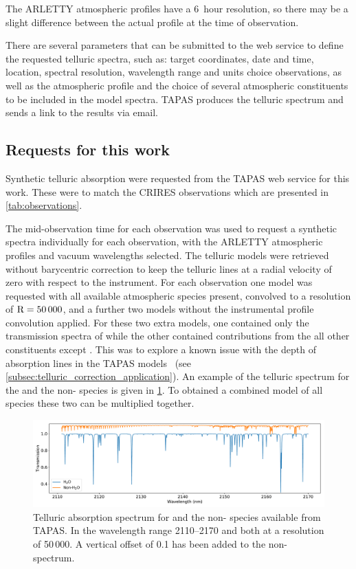 The {ARLETTY} atmospheric profiles have a 6~hour resolution, so there may be a slight difference between the actual profile at the time of observation.

There are several parameters that can be submitted to the web service to define the requested telluric spectra, such as: target coordinates, date and time, location, spectral resolution, wavelength range and units choice observations, as well as the atmospheric profile and the choice of several atmospheric constituents to be included in the model spectra. {TAPAS} produces the telluric spectrum and sends a link to the results via email.


\subsection{Requests for this work}
Synthetic telluric absorption were requested from the {TAPAS} web service for this work.
These were to match the {CRIRES} observations which are presented in \cref{tab:observations}.

The mid-observation time for each observation was used to request a synthetic spectra individually for each observation, with the {ARLETTY} atmospheric profiles and vacuum wavelengths selected.
The telluric models were retrieved without barycentric correction to keep the telluric lines at a radial velocity of zero with respect to the instrument.
For each observation one model was requested with all available atmospheric species present, convolved to a resolution of \(\rm R=50\,000\), and a further two models without the instrumental profile convolution applied.
For these two extra models, one contained only the transmission spectra of  while the other contained contributions from the all other constituents except .
This was to explore a known issue with the depth of  absorption lines in the {TAPAS} models~\citet{bertaux_tapas_2014} (see \cref{subsec:telluric_correction_application}).
An example of the telluric spectrum for the  and the non- species is given in \cref{fig:telluriccomponents}. To obtained a combined model of all species these two can be multiplied together.

\begin{figure}
    \centering
    \includegraphics[width=0.9\linewidth]{figures/atmos_and_models/telluric_components}
    \caption{Telluric absorption spectrum for  and the non- species available from {TAPAS}. In the wavelength range 2110--2170\nm{} and both at a resolution of 50\,000. A vertical offset of 0.1 has been added to the non- spectrum.}
    \label{fig:telluriccomponents}
\end{figure}


